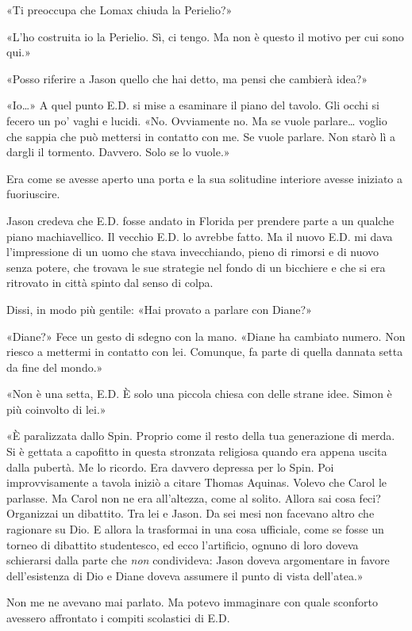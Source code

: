 «Ti preoccupa che Lomax chiuda la Perielio?»

«L'ho costruita io la Perielio. Sì, ci tengo. Ma non è questo il motivo
per cui sono qui.»

«Posso riferire a Jason quello che hai detto, ma pensi che cambierà
idea?»

«Io\ldots» A quel punto E.D. si mise a esaminare il piano del tavolo.
Gli occhi si fecero un po' vaghi e lucidi. «No. Ovviamente no. Ma se
vuole parlare\ldots{} voglio che sappia che può mettersi in contatto con
me. Se vuole parlare. Non starò lì a dargli il tormento. Davvero. Solo
se lo vuole.»

Era come se avesse aperto una porta e la sua solitudine interiore avesse
iniziato a fuoriuscire.

Jason credeva che E.D. fosse andato in Florida per prendere parte a un
qualche piano machiavellico. Il vecchio E.D. lo avrebbe fatto. Ma il
nuovo E.D. mi dava l'impressione di un uomo che stava invecchiando,
pieno di rimorsi e di nuovo senza potere, che trovava le sue strategie
nel fondo di un bicchiere e che si era ritrovato in città spinto dal
senso di colpa.

Dissi, in modo più gentile: «Hai provato a parlare con Diane?»

«Diane?» Fece un gesto di sdegno con la mano. «Diane ha cambiato numero.
Non riesco a mettermi in contatto con lei. Comunque, fa parte di quella
dannata setta da fine del mondo.»

«Non è una setta, E.D. È solo una piccola chiesa con delle strane idee.
Simon è più coinvolto di lei.»

«È paralizzata dallo Spin. Proprio come il resto della tua generazione
di merda. Si è gettata a capofitto in questa stronzata religiosa quando
era appena uscita dalla pubertà. Me lo ricordo. Era davvero depressa per
lo Spin. Poi improvvisamente a tavola iniziò a citare Thomas Aquinas.
Volevo che Carol le parlasse. Ma Carol non ne era all'altezza, come al
solito. Allora sai cosa feci? Organizzai un dibattito. Tra lei e Jason.
Da sei mesi non facevano altro che ragionare su Dio. E allora la
trasformai in una cosa ufficiale, come se fosse un torneo di dibattito
studentesco, ed ecco l'artificio, ognuno di loro doveva schierarsi dalla
parte che \emph{non} condivideva: Jason doveva argomentare in favore
dell'esistenza di Dio e Diane doveva assumere il punto di vista
dell'atea.»

Non me ne avevano mai parlato. Ma potevo immaginare con quale sconforto
avessero affrontato i compiti scolastici di E.D.

